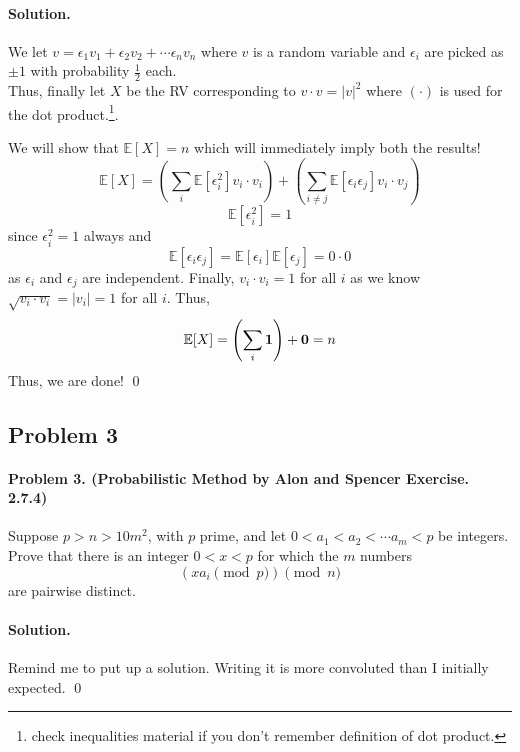 \documentclass[12pt]{article}
\newenvironment{solution}
{\paragraph{Solution.}}
{\qed\eject}
\newcommand*{\EE}{\mathbb{E}}
\begin{document}
\begin{solution}
    We let $v=\epsilon_1v_1+\epsilon_2v_2+\cdots \epsilon_nv_n$ where $v$ is a random variable and $\epsilon_i$ are picked as $\pm 1$ with probability $\frac{1}{2}$ each.\\

    Thus, finally let $X$ be the RV corresponding to $v\cdot v=|v|^2$ where $(\cdot)$ is used for the dot product.\footnote{check inequalities material if you don't remember definition of dot product.}.

    We will show that $\EE[X]=n$ which will immediately imply both the results! \[\EE[X]=\left(\sum_{i}\EE[\epsilon_i^2]v_i\cdot v_i\right)+\left(\sum_{i\ne j}\EE[\epsilon_i\epsilon_j]v_i\cdot v_j\right)\]
    \[\EE[\epsilon_i^2]=1\] since $\epsilon_i^2=1$ always and \[\EE[\epsilon_i\epsilon_j]=\EE[\epsilon_i]\EE[\epsilon_j]=0\cdot 0\]
    as $\epsilon_i$ and $\epsilon_j$ are independent. Finally, $v_i\cdot v_i=1$ for all $i$ as we know $\sqrt{v_i\cdot v_i}=|v_i|=1$ for all $i$. Thus, \[\EE[X]=\left(\sum_i {\bf 1}\right)+{\bf 0}=n\]
    Thus, we are done!
\end{solution}

\subsection*{Problem 3}

\paragraph{\textbf{Problem 3. (Probabilistic Method by Alon and Spencer Exercise. 2.7.4)}} Suppose $p>n>10m^2$, with $p$ prime, and let $0<a_1<a_2<\cdots a_m<p$ be integers. Prove that there is an integer $0<x<p$ for which the $m$ numbers \[(xa_i \pmod{p})\pmod n\] are pairwise distinct.

\begin{solution}
    Remind me to put up a solution. Writing it is more convoluted than I initially expected.
\end{solution}
\end{document}
